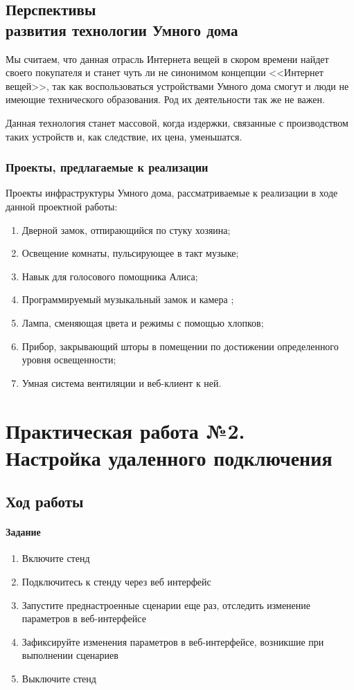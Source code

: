 \documentclass[a4paper,14pt]{extarticle}
\begin{document}
\fi
\subsection{Перспективы\\развития технологии Умного дома}
Мы считаем, что данная отрасль Интернета вещей в скором времени найдет своего покупателя и станет чуть ли не синонимом концепции <<Интернет вещей>>, так как воспользоваться устройствами Умного дома смогут и люди не имеющие технического образования. Род их деятельности так же не важен.

Данная технология станет массовой, когда издержки, связанные с производством таких устройств и, как следствие, их цена, уменьшатся.
\subsubsection*{Проекты, предлагаемые к реализации}
Проекты инфраструктуры Умного дома, рассматриваемые к реализации в ходе данной проектной работы:
\begin{enumerate}
	\item Дверной замок, отпирающийся по стуку хозяина;
	\item Освещение комнаты, пульсирующее в такт музыке;
	\item Навык для голосового помощника Алиса;
	\item Программируемый музыкальный замок и камера ;
	\item Лампа, сменяющая цвета и режимы с помощью хлопков;
	\item Прибор, закрывающий шторы в помещении по достижении определенного уровня освещенности;
	\item Умная система вентиляции и веб-клиент к ней.
\end{enumerate}
\newpage

\section{Практическая работа №2.\\Настройка удаленного подключения}
\subsection{Ход работы}
\paragraph{Задание}
\begin{enumerate}
	\item Включите стенд 
    \item Подключитесь к стенду через веб интерфейс 
	\item Запустите преднастроенные сценарии еще раз, отследить изменение параметров в веб-интерфейсе 
	\item Зафиксируйте изменения параметров в веб-интерфейсе, возникшие при выполнении сценариев
	\item Выключите стенд
\end{enumerate}
\end{document}
